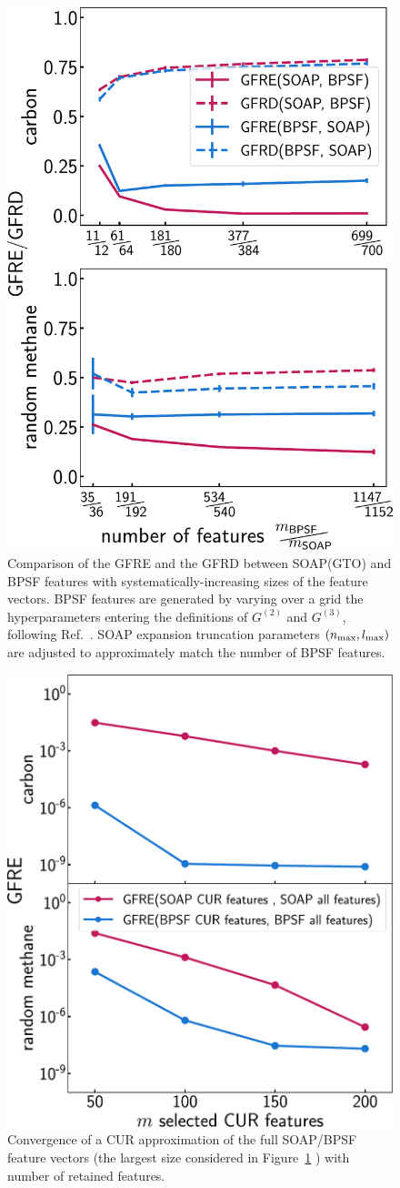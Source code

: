 
\begin{figure}
    \centering
    \includegraphics[width=0.45\linewidth]{fig/rof/symmetry_function_comparison-carbon_methane-updated_gfrd-inkscaped.pdf}
    \caption{Comparison of the GFRE and the GFRD between SOAP(GTO) and BPSF features with systematically-increasing sizes of the feature vectors. BPSF features are generated by varying over a grid the hyperparameters entering the definitions of $G^{(2)}$ and $G^{(3)}$, following Ref.~. SOAP expansion truncation parameters $(n_\mathrm{max},l_\mathrm{max})$ are adjusted to approximately match the number of BPSF features.}
    \label{fig:soap_behler_parinello}
\end{figure}


\begin{figure}
    \centering
    \includegraphics[width=0.45\linewidth]{fig/rof/feature_select_convergence_comparison-soap_bpsf-carbon_methane-inkscaped.pdf}
    \caption{Convergence of a CUR approximation of the full SOAP/BPSF feature vectors (the largest size considered in Figure~\ref{fig:soap_behler_parinello} )  with number of retained features.}
    \label{fig:soap_behler_parinello-convergence}
\end{figure}

